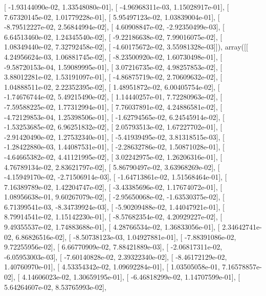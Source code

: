 \documentclass{article}
\begin{document}
       [ -1.93144090e-02,   1.33548080e-01],
       [ -4.96968311e-03,   1.15028917e-01],
       [  7.67320145e-02,   1.01779228e-01],
       [  5.95497123e-02,   1.03839004e-01],
       [ -8.79512227e-02,   2.56844994e-02],
       [  4.60908847e-02,  -2.92350499e-03],
       [  6.64513460e-02,   1.24345540e-02],
       [ -9.22186638e-02,   7.99016075e-02],
       [  1.08349440e-02,   7.32792458e-02],
       [ -4.60175672e-02,   3.55981328e-03]]), array([[  4.24956624e-03,   1.06881745e-02],
       [ -8.23500920e-02,   1.60730498e-01],
       [ -9.58720153e-04,   1.59089995e-01],
       [  3.07216735e-02,   4.98257853e-02],
       [  3.88012281e-02,   1.53191097e-01],
       [ -4.86875719e-02,   2.70609632e-02],
       [  1.04888511e-02,   2.22352395e-02],
       [  1.48951872e-02,   6.00405754e-02],
       [ -1.74676744e-02,   5.49215490e-02],
       [  1.14440257e-01,   7.72280963e-02],
       [ -7.59588225e-02,   1.77312994e-01],
       [  7.76037891e-02,   4.24886581e-02],
       [ -4.72129853e-04,   1.25398506e-01],
       [ -1.62794565e-02,   6.24545914e-02],
       [ -1.53253685e-02,   6.96251832e-02],
       [  2.05793513e-02,   1.67227702e-01],
       [ -2.91420490e-02,   1.27532340e-01],
       [ -5.41939495e-02,   3.81318515e-03],
       [ -1.28422880e-03,   1.44087531e-01],
       [ -2.28632786e-02,   1.50871028e-01],
       [ -4.64665382e-02,   4.41121995e-02],
       [  3.02242975e-02,   1.26206316e-01],
       [  4.76789134e-02,   2.83621797e-02],
       [  5.86790497e-02,   3.63968269e-02],
       [ -4.15949170e-02,  -2.71506914e-03],
       [ -1.64713861e-02,   1.51568464e-01],
       [  7.16389789e-02,   1.42204747e-02],
       [ -3.43385696e-02,   1.17674072e-01],
       [  1.08956638e-01,   9.60267079e-02],
       [ -2.95650068e-02,  -1.63530375e-02],
       [  6.71399541e-03,  -8.34739924e-03],
       [ -5.90209488e-02,   1.44047921e-01],
       [  8.79914541e-02,   1.15142230e-01],
       [ -8.57682354e-02,   4.20929227e-02],
       [  9.49355537e-02,   1.74883688e-01],
       [  4.28766534e-02,   1.36833056e-01],
       [  2.34642741e-02,   6.86826516e-02],
       [ -8.50738123e-03,   1.04927881e-01],
       [ -7.88391086e-02,   9.72255956e-02],
       [  6.66770909e-02,   7.88421889e-03],
       [ -2.06817311e-02,  -6.05953003e-03],
       [ -7.60140828e-02,   2.39322340e-02],
       [ -8.46172129e-02,   1.40760970e-01],
       [  4.53354342e-02,   1.09692284e-01],
       [  1.03505058e-01,   7.16578857e-02],
       [  4.14606023e-02,   1.30659195e-01],
       [ -6.46818299e-02,   1.14707599e-01],
       [  5.64264607e-02,   8.53765993e-02],
\end{document}

